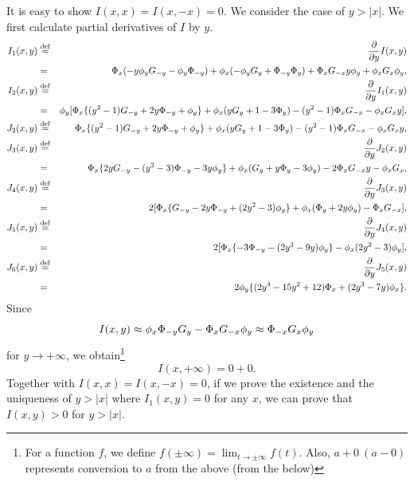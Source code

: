\bigskip

 \quad
It is easy to show $I(x,x)=I(x,-x)=0$.  We consider the case of $y>|x|$.  We first calculate partial derivatives of $I$ by $y$.  
\begin{eqnarray*}
  I_1(x,y)
   & \stackrel{\mathrm{def}}{=} & \frac{\partial}{\partial y} I(x,y) \\
   & = & \Phi_x (-y \phi_y G_{-y} - \phi_y \Phi_{-y}) + \phi_x (-\phi_y G_y + \Phi_{-y} \Phi_y) + \Phi_x G_{-x} y \phi_y + \phi_x G_x \phi_y, \\
  I_2(x,y)
   & \stackrel{\mathrm{def}}{=} & \frac{\partial}{\partial y} I_1(x,y) \\
   & = & \phi_y [ \Phi_x \{ (y^2-1) G_{-y} + 2y \Phi_{-y} + \phi_y \} + \phi_x (yG_y + 1 - 3\Phi_y) -(y^2-1)\Phi_xG_{-x} - \phi_x G_x y ], \\
  J_2(x,y)
   & \stackrel{\mathrm{def}}{=} & \Phi_x \{ (y^2-1) G_{-y} + 2y \Phi_{-y} + \phi_y \} + \phi_x (yG_y + 1 - 3\Phi_y) -(y^2-1)\Phi_xG_{-x} - \phi_x G_x y, \\
  J_3(x,y)
   & \stackrel{\mathrm{def}}{=} & \frac{\partial}{\partial y} J_2(x,y) \\
   & = & \Phi_x \{ 2y G_{-y} - (y^2-3) \Phi_{-y} -3y\phi_y \} + \phi_x ( G_y +y \Phi_y -3\phi_y ) -2 \Phi_x G_{-x} y - \phi_x G_x, \\
  J_4(x,y)
   & \stackrel{\mathrm{def}}{=} & \frac{\partial}{\partial y} J_3(x,y) \\
   & = & 2 [ \Phi_x \{ G_{-y} - 2y \Phi_{-y} + (2y^2-3) \phi_y \} + \phi_x (\Phi_y + 2y \phi_y) - \Phi_x G_{-x} ], \\
  J_5(x,y)
   & \stackrel{\mathrm{def}}{=} & \frac{\partial}{\partial y} J_4(x,y) \\
   & = & 2 [ \Phi_x \{ -3 \Phi_{-y} -(2y^3-9y) \phi_y \} - \phi_x (2y^2-3) \phi_y ], \\
  J_6(x,y)
   & \stackrel{\mathrm{def}}{=} & \frac{\partial}{\partial y} J_5(x,y) \\
   & = & 2 \phi_y \{ (2y^4-15y^2+12) \Phi_x + (2y^3-7y) \phi_x \}.
\end{eqnarray*}
Since 
\[
 I(x,y) \approx \phi_x \Phi_{-y} G_y - \Phi_x G_{-x} \phi_y \approx \Phi_{-x} G_x \phi_y
\]
for $y \rightarrow +\infty$, we obtain\footnote{For a function $f$, we define $f(\pm \infty)=\lim_{t \rightarrow \pm \infty} f(t)$.  Also, $a+0\ (a-0)$ represents conversion to $a$ from the above (from the below)}
\[
 I(x,+\infty) = 0+0.
\]
Together with $I(x,x) = I(x,-x) = 0$, if we prove the existence and the uniqueness of $y>|x|$ where $I_1(x,y)=0$ for any $x$, we can prove that $I(x,y)>0$ for $y>|x|$.

